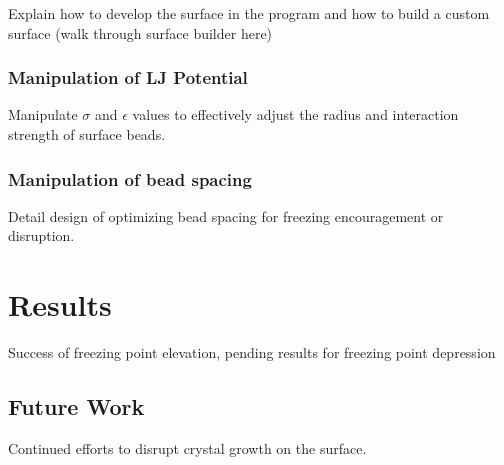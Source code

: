 Explain how to develop the surface in the program and how to build a custom surface 
(walk through surface builder here)

\subsubsection{Manipulation of LJ Potential}

Manipulate $\sigma$ and $\epsilon$ values to effectively adjust the radius and interaction strength of surface beads.

\subsubsection{Manipulation of bead spacing}

Detail design of optimizing bead spacing for freezing encouragement or disruption.

\section{Results}

Success of freezing point elevation, pending results for freezing point depression

\subsection{Future Work}

Continued efforts to disrupt crystal growth on the surface. 


